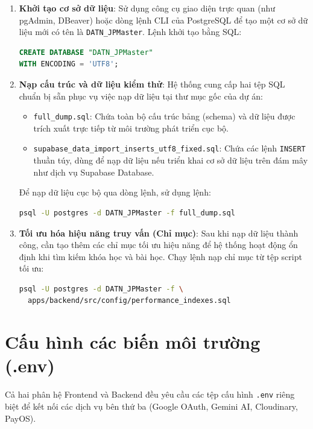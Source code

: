 \documentclass[../DoAn.tex]{subfiles}
\begin{document}
\begin{enumerate}
    \item \textbf{Khởi tạo cơ sở dữ liệu}: 
    Sử dụng công cụ giao diện trực quan (như pgAdmin, DBeaver) hoặc dòng lệnh CLI của PostgreSQL để tạo một cơ sở dữ liệu mới có tên là \texttt{DATN\_JPMaster}. Lệnh khởi tạo bằng SQL:
    \begin{lstlisting}[language=SQL]
CREATE DATABASE "DATN_JPMaster" 
WITH ENCODING = 'UTF8';
    \end{lstlisting}

    \item \textbf{Nạp cấu trúc và dữ liệu kiểm thử}:
    Hệ thống cung cấp hai tệp SQL chuẩn bị sẵn phục vụ việc nạp dữ liệu tại thư mục gốc của dự án:
    \begin{itemize}
        \item \texttt{full\_dump.sql}: Chứa toàn bộ cấu trúc bảng (schema) và dữ liệu được trích xuất trực tiếp từ môi trường phát triển cục bộ.
        \item \texttt{supabase\_data\_import\_inserts\_utf8\_fixed.sql}: Chứa các lệnh \texttt{INSERT} thuần túy, dùng để nạp dữ liệu nếu triển khai cơ sở dữ liệu trên đám mây như dịch vụ Supabase Database.
    \end{itemize}
    Để nạp dữ liệu cục bộ qua dòng lệnh, sử dụng lệnh:
    \begin{lstlisting}[language=bash]
psql -U postgres -d DATN_JPMaster -f full_dump.sql
    \end{lstlisting}

    \item \textbf{Tối ưu hóa hiệu năng truy vấn (Chỉ mục)}:
    Sau khi nạp dữ liệu thành công, cần tạo thêm các chỉ mục tối ưu hiệu năng để hệ thống hoạt động ổn định khi tìm kiếm khóa học và bài học. Chạy lệnh nạp chỉ mục từ tệp script tối ưu:
    \begin{lstlisting}[language=bash]
psql -U postgres -d DATN_JPMaster -f \
  apps/backend/src/config/performance_indexes.sql
    \end{lstlisting}
\end{enumerate}

\section{Cấu hình các biến môi trường (.env)}
Cả hai phân hệ Frontend và Backend đều yêu cầu các tệp cấu hình \texttt{.env} riêng biệt để kết nối các dịch vụ bên thứ ba (Google OAuth, Gemini AI, Cloudinary, PayOS).
\end{document}
